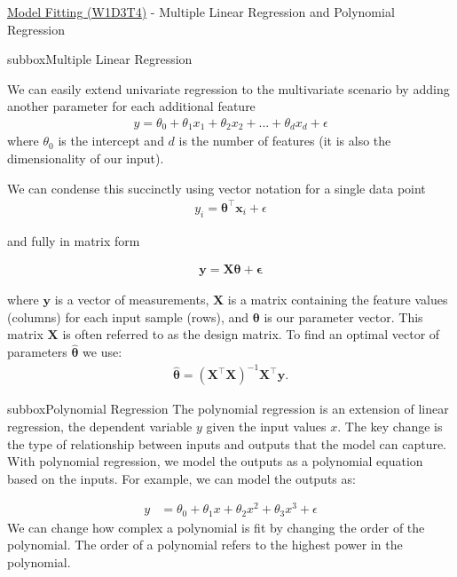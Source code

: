 \begin{textbox}{\href{https://compneuro.neuromatch.io/tutorials/W1D3_ModelFitting/student/W1D3_Tutorial4.html}{Model Fitting (W1D3T4)} -  Multiple Linear Regression and Polynomial Regression}
\begin{subbox}{subbox}{Multiple Linear Regression}
\scriptsize

We can easily extend univariate regression to the multivariate scenario by adding another parameter for each additional feature
\begin{align}
y = \theta_0 + \theta_1 x_1 + \theta_2 x_2 + ... +\theta_d x_d + \epsilon
\end{align}
where $\theta_0$ is the intercept and $d$ is the number of features (it is also the dimensionality of our input).

We can condense this succinctly using vector notation for a single data point
\begin{align}
y_i = \boldsymbol{\theta}^{\top}\mathbf{x}_i + \epsilon
\end{align}

and fully in matrix form

\begin{align}
\mathbf{y} = \mathbf{X}\boldsymbol{\theta} + \mathbf{\epsilon}
\end{align}

where $\mathbf{y}$ is a vector of measurements, $\mathbf{X}$ is a matrix containing the feature values (columns) for each input sample (rows), and $\boldsymbol{\theta}$ is our parameter vector.
This matrix $\mathbf{X}$ is often referred to as the design matrix.
To find an optimal vector of parameters $\boldsymbol{\hat\theta}$ we use:
\begin{align}
\boldsymbol{\hat\theta} = (\mathbf{X}^\top\mathbf{X})^{-1}\mathbf{X}^\top\mathbf{y}.
\end{align}
\end{subbox}
\begin{subbox}{subbox}{Polynomial Regression}
\scriptsize
The polynomial regression is an extension of linear regression, the dependent variable $y$ given the input values $x$. The key change is the type of relationship between inputs and outputs that the model can capture.
With polynomial regression, we model the outputs as a polynomial equation based on the inputs. For example, we can model the outputs as:

\begin{align}
y & = \theta_0 + \theta_1 x + \theta_2 x^2 + \theta_3 x^3 + \epsilon
\end{align}
We can change how complex a polynomial is fit by changing the order of the polynomial. The order of a polynomial refers to the highest power in the polynomial. 


\end{subbox}
\end{textbox}

